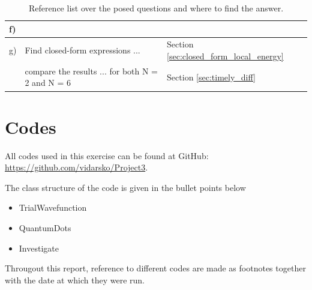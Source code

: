 \documentclass[a4paper,10pt,english]{article}
\numberwithin{figure}{subsection}
\numberwithin{table}{subsection}
\numberwithin{equation}{subsection}
\begin{document}
\begin{appendices}
\begin{table}[h!]
\begin{tabular}{lll}
        \midrule 
        f) \\
        \midrule
        g) &  Find closed-form expressions ... & Section \ref{sec:closed_form_local_energy} \\
           & compare the results ... for both N = 2 and N = 6 & Section \ref{sec:timely_diff} \\
        \bottomrule
        \end{tabular}
        \caption{Reference list over the posed questions and where to find the answer.}
\end{table}



\clearpage


\section{Codes} \label{sec:codes}
All codes used in this exercise can be found at GitHub: \newline
\url{https://github.com/vidarsko/Project3}. 

The class structure of the code is given in the bullet points below

\begin{itemize}
    \item TrialWavefunction
    \item QuantumDots
    \item Investigate
\end{itemize}

Througout this report, reference to different codes are made as footnotes together with the date at which they were run. 

\end{appendices}
\end{document}
